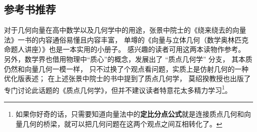 \subsection{参考书推荐}
对于几何向量在高中数学以及几何学中的用途，张景中院士的《绕来绕去的向量法》一书的内容通俗易懂且内容丰富， 单墫的《向量与立体几何（数学奥林匹克命题人讲座）》也是一本实用的小册子。 感兴趣的读者可用这两本读物作参考。 另外，数学界也借用物理中“质心”的概念，发展出了 “质点几何学” 分支， 其本质仍然和向量几何一模一样， 只不过换了个观点看问题，实质上是仿射几何的一种优化版表述； 在上述张景中院士的书中提到了质点几何学， 莫绍揆教授也出版了专门讨论此话题的《质点几何学》，但并不建议读者特意花太多精力学习\footnote{如果你好奇的话，只需要知道向量法中的\textbf{定比分点公式}就是连接质点几何和向量几何的桥梁，就可以把几何问题在这两个观点之间互相转化了。}。
